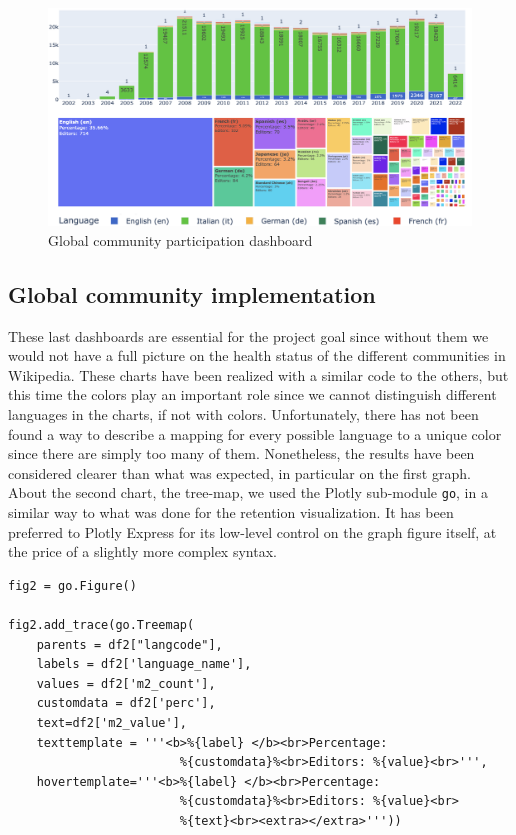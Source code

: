 \begin{figure}[h]
    \centering
   \includegraphics[width=470px]{img/global.png}
    \caption{Global community participation dashboard}
    \label{fig:global}
\end{figure}


\subsection{Global community implementation}
\label{sec:global_community_callback}

These last dashboards are essential for the project goal since without them we would not have a full picture on the health status of the different communities in Wikipedia. These charts have been realized with a similar code to the others, but this time the colors play an important role since we cannot distinguish different languages in the charts, if not with colors. Unfortunately, there has not been found a way to describe a mapping for every possible language to a unique color since there are simply too many of them. Nonetheless, the results have been considered clearer than what was expected, in particular on the first graph.\\
About the second chart, the tree-map, we used the Plotly sub-module \verb#go#, in a similar way to what was done for the retention visualization. It has been preferred to Plotly Express for its low-level control on the graph figure itself, at the price of a slightly more complex syntax. 
\pagebreak
\lstset{frame=lines}
\lstset{basicstyle=\footnotesize}
\lstset{caption=Creating a treemap chart}
\begin{lstlisting}
fig2 = go.Figure()

fig2.add_trace(go.Treemap(
    parents = df2["langcode"],
    labels = df2['language_name'],
    values = df2['m2_count'],
    customdata = df2['perc'],
    text=df2['m2_value'],
    texttemplate = '''<b>%{label} </b><br>Percentage: 
                        %{customdata}%<br>Editors: %{value}<br>''',
    hovertemplate='''<b>%{label} </b><br>Percentage: 
                        %{customdata}%<br>Editors: %{value}<br>
                        %{text}<br><extra></extra>'''))
\end{lstlisting}

